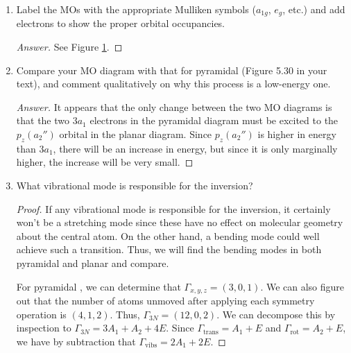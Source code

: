 \documentclass[../psets.tex]{subfiles}
\begin{document}
\begin{enumerate}[label={\Roman*)}]
\begin{enumerate}[label={\alph*)}]
\begin{proof}[Answer]
\begin{figure}[H]
                \caption{Planar ${\ce{NH3}}^\ddagger$ orbital diagram.}
                \label{fig:orbitalDiagram-NH3-planar}
            \end{figure}
        \end{proof}
        \item Label the MOs with the appropriate Mulliken symbols ($a_{1g}$, $e_g$, etc.) and add electrons to show the proper orbital occupancies.
        \begin{proof}[Answer]
            See Figure \ref{fig:orbitalDiagram-NH3-planar}.
        \end{proof}
        \item Compare your MO diagram with that for pyramidal  (Figure 5.30 in your text), and comment qualitatively on why this process is a low-energy one.
        \begin{proof}[Answer]
            It appears that the only change between the two MO diagrams is that the two $3a_1$ electrons in the pyramidal  diagram must be excited to the $p_z(a_2'')$ orbital in the planar  diagram. Since $p_z(a_2'')$ is higher in energy than $3a_1$, there will be an increase in energy, but since it is only marginally higher, the increase will be very small.
        \end{proof}
        \item What vibrational mode is responsible for the inversion?
        \begin{proof}
            If any vibrational mode is responsible for the inversion, it certainly won't be a stretching mode since these have no effect on molecular geometry about the central atom. On the other hand, a bending mode could well achieve such a transition. Thus, we will find the bending modes in both pyramidal and planar  and compare.\par\medskip
            For pyramidal , we can determine that $\Gamma_{x,y,z}=(3,0,1)$. We can also figure out that the number of atoms unmoved after applying each symmetry operation is $(4,1,2)$. Thus, $\Gamma_{3N}=(12,0,2)$. We can decompose this by inspection to $\Gamma_{3N}=3A_1+A_2+4E$. Since $\Gamma_\text{trans}=A_1+E$ and $\Gamma_\text{rot}=A_2+E$, we have by subtraction that $\Gamma_\text{vibs}=2A_1+2E$.\par

\end{proof}
\end{enumerate}
\end{enumerate}
\end{document}
